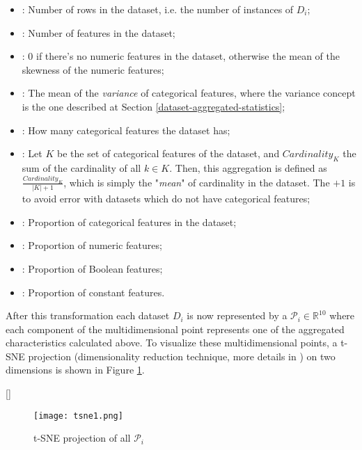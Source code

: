 \begin{itemize}
    \item \textbf{}: Number of rows in the dataset, i.e. the number of instances of $D_i$;
    \item \textbf{}: Number of features in the dataset;
    \item \textbf{}: $0$ if there's no numeric features in the dataset, otherwise the mean of the skewness of the numeric features;
    \item \textbf{}: The mean of the \textit{variance} of categorical features, where the variance concept is the one described at Section \ref{dataset-aggregated-statistics};
    \item \textbf{}: How many categorical features the dataset has;
    \item \textbf{}: Let $K$ be the set of categorical features of the dataset, and $Cardinality_K$ the sum of the cardinality of all $k\in K$. Then, this aggregation is defined as $\frac{Cardinality_K}{|K| + 1}$, which is simply the "\textit{mean}" of cardinality in the dataset. The $+1$ is to avoid error with datasets which do not have categorical features;
    \item \textbf{}: Proportion of categorical features in the dataset;
    \item \textbf{}: Proportion of numeric features;
    \item \textbf{}: Proportion of Boolean features;
    \item \textbf{}: Proportion of constant features.
\end{itemize}


After this transformation each dataset $D_i$ is now represented by a $\mathcal{P}_i \in \mathbb{R}^{10}$ where each component of the multidimensional point represents one of the aggregated characteristics calculated above. To visualize these multidimensional points, a t-SNE projection (dimensionality reduction technique, more details in \cite{maaten2008visualizing}) on two dimensions is shown in Figure \ref{fig:tsne-1}.

\ref{} %
\begin{figure}[!h]
    \centering
    \texttt{[image: tsne1.png]}
    \caption{t-SNE projection of all $\mathcal{P}_i$}
    \label{fig:tsne-1}
\end{figure}

